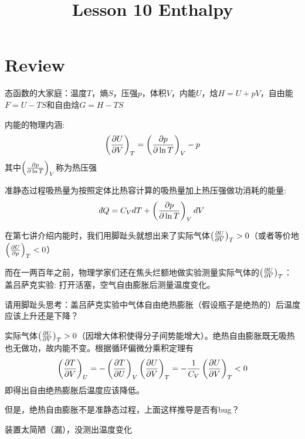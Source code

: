 \documentclass[CJK]{beamer}
\title{Lesson 10 Enthalpy}
\author{}
\date{}
\begin{document}

\section{Review}

\begin{frame}
\bch 
\bitem
\item{态函数的大家庭：温度$T$，熵$S$，压强$p$，体积$V$，内能$U$，焓$H=U+pV$，自由能$F=U-TS$和自由焓$G=H-TS$}
\item{内能的物理内涵:
 $$\left(\frac{\partial U}{\partial V}\right)_{T} = \left(\frac{\partial p}{\partial \ln T}\right)_{V} - p $$
其中$\left(\frac{\partial p}{\partial \ln T}\right)_{V}$称为热压强}
\item{准静态过程吸热量为按照定体比热容计算的吸热量加上热压强做功消耗的能量:
$$ \dbar Q = C_V dT + \pfrac p{\ln T}V dV$$}
\eitem
\ech
\end{frame}

\begin{frame}
\bch
在第七讲介绍内能时，我们用脚趾头就想出来了实际气体$\left(\frac{\partial U}{\partial V}\right)_{T} > 0$（或者等价地$\left(\frac{\partial U}{\partial p}\right)_{T} < 0$）

而在一两百年之前，物理学家们还在焦头烂额地做实验测量实际气体的$\left(\frac{\partial U}{\partial V}\right)_{T} $：
盖吕萨克实验: 打开活塞，空气自由膨胀后测量温度变化。
\emini
{}
\emini

\ech
\end{frame}


\begin{frame}
\bch
{}
请用脚趾头思考：盖吕萨克实验中气体自由绝热膨胀（假设瓶子是绝热的）后温度应该上升还是下降？
\ech
\end{frame}


\begin{frame}
\bch
{}
实际气体$\left(\frac{\partial U}{\partial V}\right)_{T}>0$（因增大体积使得分子间势能增大）。绝热自由膨胀既无吸热也无做功，故内能不变。根据循环偏微分乘积定理有
$$\left(\frac{\partial T}{\partial V}\right)_{U} = -\left(\frac{\partial T}{\partial U}\right)_{V} \left(\frac{\partial U}{\partial V}\right)_{T} = -\frac{1}{C_V} \left(\frac{\partial U}{\partial V}\right)_{T} < 0$$
即得出自由绝热膨胀后温度应该降低。

\skipline

但是，绝热自由膨胀不是准静态过程，上面这样推导是否有bug？

\ech
\end{frame}


\begin{frame}
\bch


装置太简陋（漏），没测出温度变化 
\ech
\end{frame}
\end{document}
